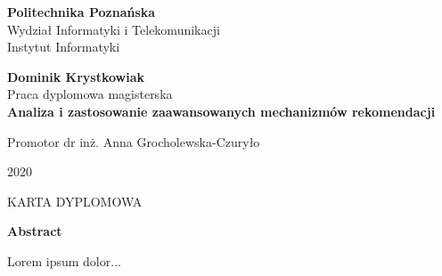\documentclass[a4paper,12pt,twoside,openany]{report}
\begin{document}
\begin{titlepage}
    \begin{center}
        \large
        \textbf{Politechnika Poznańska}\\
        Wydział Informatyki i Telekomunikacji\\
        Instytut Informatyki\\
        \vspace{1.5cm}
            
        \textbf{Dominik Krystkowiak}\\
        Praca dyplomowa magisterska\\
        
        \vspace{1cm}
        \Huge
        \textbf{
        Analiza i zastosowanie zaawansowanych mechanizmów rekomendacji}
            
        \vfill
        \begin{flushright}\large
        Promotor dr inż. Anna Grocholewska-Czuryło\end{flushright}
        \vspace{0.8cm}
            
        \large
        2020
            
    \end{center}
\end{titlepage}

\thispagestyle{empty}\vspace*{\fill}%
\begin{center}KARTA DYPLOMOWA\end{center}%
\vfill\cleardoublepage%

\thispagestyle{plain}
\begin{center}
    \textbf{Abstract}
\end{center}
Lorem ipsum dolor...

\tableofcontents* 
\cleardoublepage%







\medskip



\end{document}

